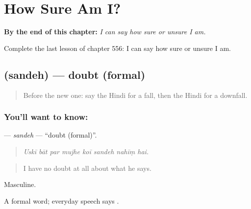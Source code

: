 
\chapter{How Sure Am I?}
\label{ch:hi-how-sure-am-i}

\begin{chapteropening}
\textbf{By the end of this chapter:} \emph{I can say how sure or unsure I am.}

Complete the last lesson of chapter 556: I can say how sure or unsure I am.
\end{chapteropening}

\section[\texorpdfstring{\hi{संदेह} (sandeh)}{संदेह (sandeh)}]{ (sandeh) — doubt (formal)}

\label{lesson:HI-C556-sandeh}



\begin{quote}
Before the new one: say the Hindi for a fall, then the Hindi for a downfall.
\end{quote}

\subsection*{You'll want to know: }
\textbf{} — \emph{sandeh} — \textquotedblleft{}doubt (formal)\textquotedblright{}.

\begin{quote}
       
\end{quote}

\begin{quote}
\emph{Uskī bāt par mujhe koī sandeh nahīṃ hai.}
\end{quote}

\begin{quote}
I have no doubt at all about what he says.
\end{quote}

Masculine.

A formal word; everyday speech says .

